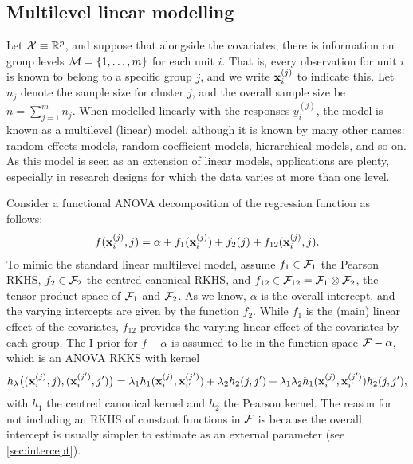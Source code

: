 \subsection{Multilevel linear modelling}
\label{sec:multilevelmodels}

Let ${\mathcal X}\equiv\mathbb{R}^p$, and suppose that alongside the covariates, there is information on group levels ${\mathcal M}= \{1,\dots,m\}$ for each unit $i$.
That is, every observation for unit $i$ is known to belong to a specific group $j$, and we write ${\mathbf x}_i^{(j)}$ to indicate this.
Let $n_j$ denote the sample size for cluster $j$, and the overall sample size be $n = \sum_{j=1}^m n_j$.
When modelled linearly with the responses $y_i^{(j)}$, the model is known as a multilevel (linear) model, although it is known by many other names: random-effects models, random coefficient models, hierarchical models, and so on.
As this model is seen as an extension of linear models, applications are plenty, especially in research designs for which the data varies at more than one level.

Consider a functional ANOVA decomposition of the regression function as follows:
\begin{align}\label{eq:anovamultilevel}
  f({\mathbf x}_i^{(j)}, j) = \alpha + f_1({\mathbf x}_i^{(j)}) + f_2(j) + f_{12}({\mathbf x}_i^{(j)}, j).  
\end{align}
To mimic the standard linear multilevel model, assume $f_1\in{\mathcal F}_1$ the Pearson RKHS, $f_2\in{\mathcal F}_2$ the centred canonical RKHS, and $f_{12} \in {\mathcal F}_{12} = {\mathcal F}_1 \otimes {\mathcal F}_2$, the tensor product space of ${\mathcal F}_1$ and ${\mathcal F}_2$.
As we know, $\alpha$ is the overall intercept, and the varying intercepts are given by the function $f_2$.
While $f_1$ is the (main) linear effect of the covariates, $f_{12}$ provides the varying linear effect of the covariates by each group.
The I-prior for $f-\alpha$ is assumed to lie in the function space ${\mathcal F}-\alpha$, which is an ANOVA RKKS with kernel
\[
  h_\lambda\big(({\mathbf x}_i^{(j)},j),({\mathbf x}_i^{(j')},j')\big) = \lambda_1 h_1({\mathbf x}_i^{(j)},{\mathbf x}_{i'}^{(j')}) + \lambda_2 h_2(j,j') + \lambda_1\lambda_2 h_1({\mathbf x}_i^{(j)},{\mathbf x}_{i'}^{(j')})h_2(j,j'),
\]
with $h_1$ the centred canonical kernel and $h_2$ the Pearson kernel.
The reason for not including an RKHS of constant functions in ${\mathcal F}$ is because the overall intercept is usually simpler to estimate as an external parameter (see \cref{sec:intercept}).

